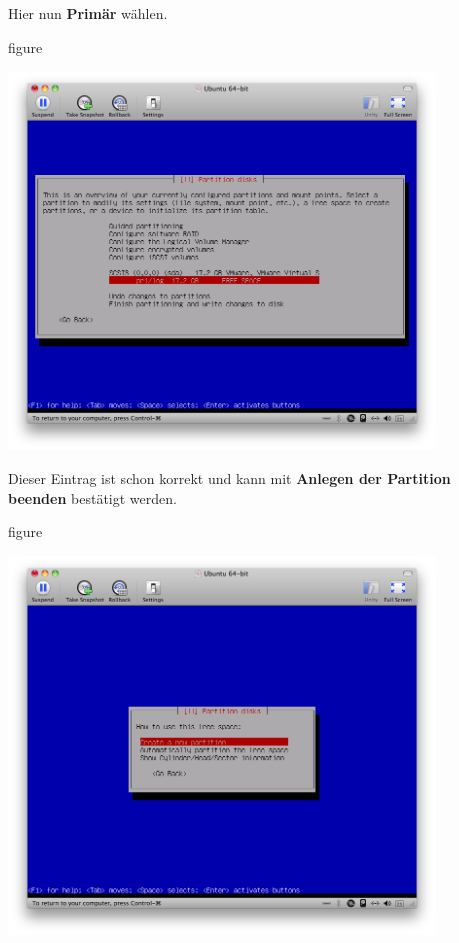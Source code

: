 Hier nun \textbf{Primär} wählen.

\begin{nofloat}{figure}
\begin{center}
\includegraphics[width=0.85\textwidth]{screenshots/13_ubuntu_install.png}
\end{center}
\end{nofloat}

\pagebreak
Dieser Eintrag ist schon korrekt und kann mit \textbf{Anlegen der Partition beenden} bestätigt werden.

\begin{nofloat}{figure}
\begin{center}
\includegraphics[width=0.85\textwidth]{screenshots/14_ubuntu_install.png}
\end{center}
\end{nofloat}

